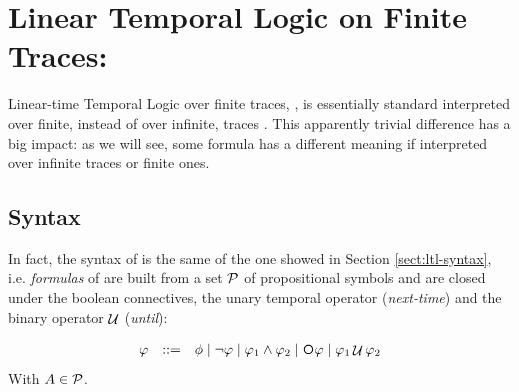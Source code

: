 %

\section{Linear Temporal Logic on Finite Traces: \LTLf}
\label{ltlf}
Linear-time Temporal Logic over finite traces, \LTLf, is essentially standard 
\LTL \citep{Pnueli:1977:TLP:1382431.1382534} interpreted over finite, instead of over infinite, traces \citep{de2013linear}.
This apparently trivial difference has a big impact: as we will see, some \LTL formula has a different meaning if interpreted over infinite traces or finite ones.

\subsection{Syntax}\label{ltlf-syntax}
In fact, the syntax of \LTLf is the same of the one showed in Section \ref{sect:ltl-syntax}, i.e. \emph{formulas} of \LTLf are built from a set $\mathcal{P}$ of propositional symbols and are closed under the boolean connectives, the unary temporal operator \Next (\emph{next-time}) and the binary operator $\mathop{\mathcal{U}}$ (\emph{until}):

\[\begin{array}{rcl}
\varphi &::=& \phi \mid \lnot \varphi \mid \varphi_1\land \varphi_2 \mid \Next\varphi \mid \varphi_1 \lUntil \varphi_2
\end{array}
\]
With $A\in \mathcal{P}$.

